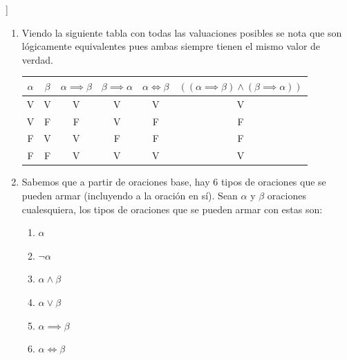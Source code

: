 \begin{sol}]
    \begin{enumerate}[label=(\alph*)]
        \item Viendo la siguiente tabla con todas las valuaciones posibles se nota que son lógicamente equivalentes pues ambas siempre tienen el mismo valor de verdad.\\
              \begin{tabular}{|c|c|c|c|c|c|}
                  \hline
                  $\alpha$ & $\beta$ & $\alpha\implies\beta$ & $\beta\implies\alpha$ & $\alpha\iff\beta$ & $((\alpha \implies \beta) \wedge (\beta \implies \alpha))$ \\
                  \hline
                  \hline
                  V        & V       & V                     & V                     & V                 & V                                                          \\
                  V        & F       & F                     & V                     & F                 & F                                                          \\
                  F        & V       & V                     & F                     & F                 & F                                                          \\
                  F        & F       & V                     & V                     & V                 & V                                                          \\
                  \hline
              \end{tabular}
        \item Sabemos que a partir de oraciones base, hay 6 tipos de oraciones que se pueden armar (incluyendo a la oración en sí). Sean $\alpha$ y $\beta$ oraciones cualesquiera, los tipos de oraciones que se pueden armar con estas son:
              \begin{enumerate}[label=\arabic*)]
                  \item $\alpha$
                  \item $\neg \alpha$
                  \item $\alpha \wedge \beta$
                  \item $\alpha \vee \beta$
                  \item $\alpha \implies \beta$
                  \item $\alpha \iff \beta$
              \end{enumerate}

\end{enumerate}
\end{sol}
